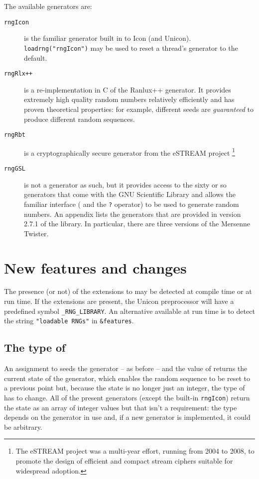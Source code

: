 \documentclass[letterpaper,12pt]{article}
\begin{document}
The available generators are:
\begin{description}
\item[\texttt{rngIcon}] is the familiar generator built in to Icon (and Unicon).\\
  \texttt{loadrng("rngIcon")} may be used to reset a thread's generator to the default.

\item[\texttt{rngRlx++}] is a re-implementation in C of the
  Ranlux++\cite{Hahnfeld:Ranlux++} generator. It provides extremely high quality random
  numbers relatively efficiently and has proven theoretical properties: for example,
  different seeds are {\em guaranteed\/} to produce different random sequences.

\item[\texttt{rngRbt}] is a cryptographically secure generator from the eSTREAM project%
\footnote{
The eSTREAM project\cite{eStream} was a multi-year effort, running from
2004 to 2008, to promote the design of efficient and compact stream ciphers
suitable for widespread adoption.
}

\item[\texttt{rngGSL}] is not a generator as such, but it provides access to the sixty or
  so generators that come with the GNU Scientific Library\cite{GnuScientificLibrary} and
  allows the familiar interface ( \rndkwd and the \texttt{?} operator) to be used to
  generate random numbers. An appendix lists the generators that are provided in version
  2.7.1 of the library. In particular, there are three versions of the Mersenne
  Twister\cite{ImprovedMT}.
\end{description}


\section{New features and changes}
The presence (or not) of the extensions to \rndkwd may be detected at compile time or at
run time. If the extensions are present, the Unicon preprocessor will have a predefined symbol
\texttt{\_RNG\_LIBRARY}. An alternative available at run time is to detect the string
\texttt{"loadable RNGs"} in \texttt{\&features}.

\subsection{The type of \rndkwd}
An assignment to \rndkwd seeds the generator -- as before -- and the value of \rndkwd
returns the current state of the generator, which enables the random sequence to be reset
to a previous point but, because the state is no longer just an integer, the type of
\rndkwd has to change. All of the present generators (except the built-in \texttt{rngIcon})
return the state as an array of integer values but that isn't a requirement: the type
depends on the generator in use and, if a new generator is implemented, it could be
arbitrary.
\end{document}
